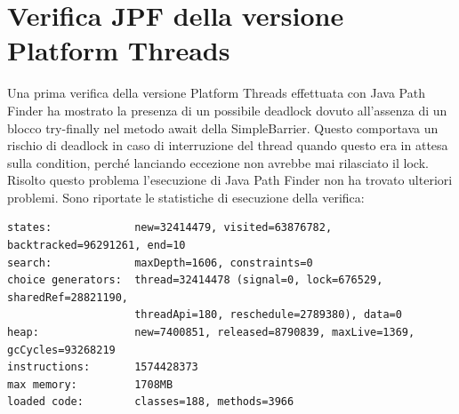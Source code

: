 \documentclass[11pt,notitlepage]{article}
\begin{document}
\section{Verifica JPF della versione Platform Threads}
Una prima verifica della versione Platform Threads effettuata con Java Path Finder ha mostrato la presenza di un possibile deadlock dovuto all'assenza di un blocco try-finally
nel metodo \textsf{await} della \textsf{SimpleBarrier}. Questo comportava un rischio di deadlock in caso di interruzione del thread quando questo era in attesa sulla condition, perché 
lanciando eccezione non avrebbe mai rilasciato il lock.
Risolto questo problema l'esecuzione di Java Path Finder non ha trovato ulteriori problemi.
Sono riportate le statistiche di esecuzione della verifica:
\begin{verbatim}
states:             new=32414479, visited=63876782, backtracked=96291261, end=10
search:             maxDepth=1606, constraints=0
choice generators:  thread=32414478 (signal=0, lock=676529, sharedRef=28821190, 
                    threadApi=180, reschedule=2789380), data=0
heap:               new=7400851, released=8790839, maxLive=1369, gcCycles=93268219
instructions:       1574428373
max memory:         1708MB
loaded code:        classes=188, methods=3966
\end{verbatim}
\end{document}
